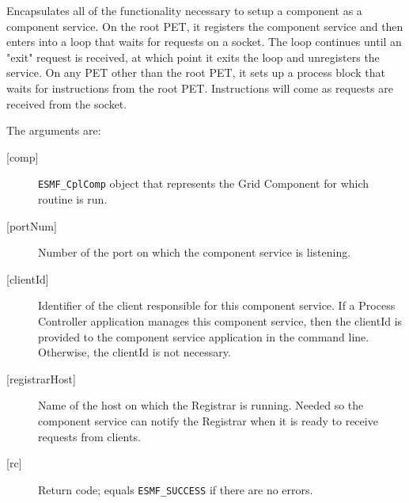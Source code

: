      Encapsulates all of the functionality necessary to setup a component as
     a component service.  On the root PET, it registers the
     component service and then enters into a loop that waits for requests on 
     a socket.  The loop continues until an "exit" request is received, at 
     which point it exits the loop and unregisters the service.  On
     any PET other than the root PET, it sets up a process block that waits
     for instructions from the root PET.  Instructions will come as requests
     are received from the socket.
  
   The arguments are:
   \begin{description}
   \item[{[comp]}]
     {\tt ESMF\_CplComp} object that represents the Grid Component for which
     routine is run.
   \item[{[portNum]}]
     Number of the port on which the component service is listening.
   \item[{[clientId]}]
     Identifier of the client responsible for this component service.  If a
     Process Controller application manages this component service, then the
     clientId is provided to the component service application in the command
     line.  Otherwise, the clientId is not necessary.
   \item[{[registrarHost]}]
     Name of the host on which the Registrar is running.  Needed so the
     component service can notify the Registrar when it is ready to receive
     requests from clients.
   \item[{[rc]}]
     Return code; equals {\tt ESMF\_SUCCESS} if there are no errors.
   \end{description}
  
\setlength{\parskip}{\oldparskip}
\setlength{\parindent}{\oldparindent}
\setlength{\baselineskip}{\oldbaselineskip}
